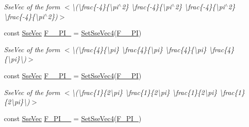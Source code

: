 \begin{DoxyCompactItemize}
\begin{DoxyCompactList}\small\item\em Sse\+Vec of the form $<$\textbackslash{}(\textbackslash{}frac\{-\/4\}\{\textbackslash{}pi$^\wedge$2\} \textbackslash{}frac\{-\/4\}\{\textbackslash{}pi$^\wedge$2\} \textbackslash{}frac\{-\/4\}\{\textbackslash{}pi$^\wedge$2\} \textbackslash{}frac\{-\/4\}\{\textbackslash{}pi$^\wedge$2\})$>$ \end{DoxyCompactList}\item 
\hypertarget{namespacegfxmath_aea61218c6969b532a24c56f9c9db5e59}{}const \hyperlink{namespacegfxmath_a0de2243e2b8d0fd46d3af5e036423004}{Sse\+Vec} \hyperlink{namespacegfxmath_aea61218c6969b532a24c56f9c9db5e59}{F\+\_\+\_\+\+P\+I\+\_} = \hyperlink{namespacegfxmath_a3b21a4362c6ac781c5f6ab922840ba77}{Set\+Sse\+Vec4}(\hyperlink{group___scalar_math_consts_ga3cd60bb81423c63766d16736f113da50}{F\+\_\+\_\+\+P\+I})\label{namespacegfxmath_aea61218c6969b532a24c56f9c9db5e59}

\begin{DoxyCompactList}\small\item\em Sse\+Vec of the form $<$\textbackslash{}(\textbackslash{}frac\{4\}\{\textbackslash{}pi\} \textbackslash{}frac\{4\}\{\textbackslash{}pi\} \textbackslash{}frac\{4\}\{\textbackslash{}pi\} \textbackslash{}frac\{4\}\{\textbackslash{}pi\}\textbackslash{})$>$ \end{DoxyCompactList}\item 
\hypertarget{namespacegfxmath_a8b2f5f313f58e1bdf39b12672a2e2ea6}{}const \hyperlink{namespacegfxmath_a0de2243e2b8d0fd46d3af5e036423004}{Sse\+Vec} \hyperlink{namespacegfxmath_a8b2f5f313f58e1bdf39b12672a2e2ea6}{F\+\_\+\_\+P\+I\+\_} = \hyperlink{namespacegfxmath_a3b21a4362c6ac781c5f6ab922840ba77}{Set\+Sse\+Vec4}(\hyperlink{group___scalar_math_consts_ga325608134effda0b7b34f7088c419db0}{F\+\_\+\_\+P\+I})\label{namespacegfxmath_a8b2f5f313f58e1bdf39b12672a2e2ea6}

\begin{DoxyCompactList}\small\item\em Sse\+Vec of the form $<$\textbackslash{}(\textbackslash{}frac\{1\}\{2\textbackslash{}pi\} \textbackslash{}frac\{1\}\{2\textbackslash{}pi\} \textbackslash{}frac\{1\}\{2\textbackslash{}pi\} \textbackslash{}frac\{1\}\{2\textbackslash{}pi\}\textbackslash{})$>$ \end{DoxyCompactList}\item 
\hypertarget{namespacegfxmath_a0dac44cfab2d2b5e50f7cf27824e4020}{}const \hyperlink{namespacegfxmath_a0de2243e2b8d0fd46d3af5e036423004}{Sse\+Vec} \hyperlink{namespacegfxmath_a0dac44cfab2d2b5e50f7cf27824e4020}{F\+\_\+\+P\+I\+\_\+\_} = \hyperlink{namespacegfxmath_a3b21a4362c6ac781c5f6ab922840ba77}{Set\+Sse\+Vec4}(\hyperlink{group___scalar_math_consts_ga0c8bf8cc8172c063476b12e41af90fdd}{F\+\_\+\+P\+I\+\_})\label{namespacegfxmath_a0dac44cfab2d2b5e50f7cf27824e4020}


\end{DoxyCompactItemize}
